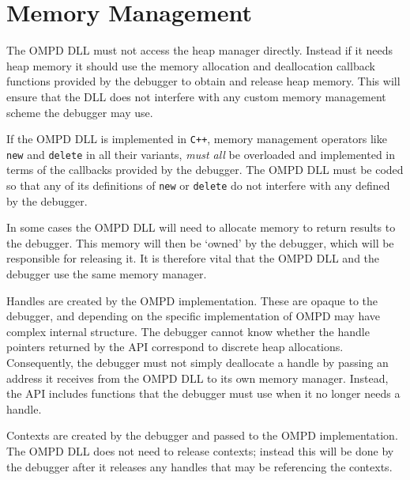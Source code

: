\section{Memory Management}
\label{memory-management:sec}

The OMPD DLL must not access the heap manager directly. Instead if it needs 
heap memory it should use the memory allocation and deallocation callback 
functions provided by the debugger to obtain and release heap memory.
This will ensure that the DLL does not interfere with any custom memory 
management scheme the debugger may use.

If the OMPD DLL is implemented in \texttt{C++}, memory management operators 
like \texttt{new} and \texttt{delete} in all their variants, \emph{must all} be 
overloaded and implemented in terms of the callbacks provided by the debugger.
The OMPD DLL must be coded so that any of its definitions of \texttt{new} or
\texttt{delete} do not interfere with any defined by the debugger.

In some cases the OMPD DLL will need to allocate memory to
return results to the debugger. This memory will then be `owned' by the 
debugger, which will be responsible for releasing it. It is therefore vital 
that the OMPD DLL and the debugger use the same memory manager.

Handles are created by the OMPD implementation. These are opaque to the 
debugger, and depending on the specific implementation of OMPD may have complex 
internal structure.
The debugger cannot know whether the handle pointers 
returned by the API correspond to discrete heap allocations. Consequently, the 
debugger must not simply deallocate a handle by passing an address it receives 
from the OMPD DLL to its own memory manager. Instead, the API includes 
functions that the debugger must use when it no longer needs a handle.

Contexts are created by the debugger and passed to the OMPD implementation.
The OMPD DLL does not need to release contexts; instead this will be done by 
the debugger after it releases any handles that may be referencing the contexts.
